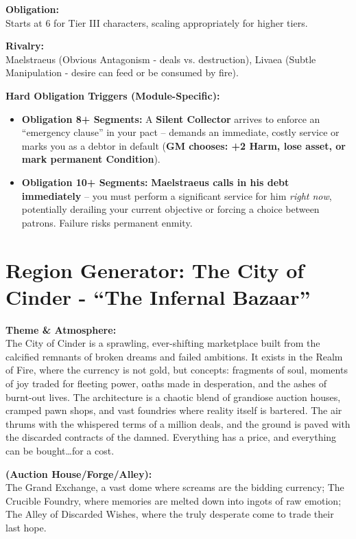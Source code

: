 \documentclass[11pt,letterpaper]{article}
\newcommand{\patronbox}[1]{\noindent\textbf{#1}\\}
\begin{document}
\patronbox{Obligation:} Starts at 6 for Tier III characters, scaling appropriately for higher tiers.

\patronbox{Rivalry:} Maelstraeus (Obvious Antagonism - deals vs. destruction), Livaea (Subtle Manipulation - desire can feed or be consumed by fire).

\patronbox{Hard Obligation Triggers (Module-Specific):}
\begin{itemize}[leftmargin=*]
    \item \textbf{Obligation 8+ Segments:} A \textbf{Silent Collector} arrives to enforce an ``emergency clause'' in your pact -- demands an immediate, costly service or marks you as a debtor in default (\textbf{GM chooses: +2 Harm, lose asset, or mark permanent Condition}).
    \item \textbf{Obligation 10+ Segments:} \textbf{Maelstraeus calls in his debt immediately} -- you must perform a significant service for him \textit{right now}, potentially derailing your current objective or forcing a choice between patrons. Failure risks permanent enmity.
\end{itemize}

\newpage

\section{Region Generator: The City of Cinder - ``The Infernal Bazaar''}

\patronbox{Theme \& Atmosphere:} The City of Cinder is a sprawling, ever-shifting marketplace built from the calcified remnants of broken dreams and failed ambitions. It exists in the Realm of Fire, where the currency is not gold, but concepts: fragments of soul, moments of joy traded for fleeting power, oaths made in desperation, and the ashes of burnt-out lives. The architecture is a chaotic blend of grandiose auction houses, cramped pawn shops, and vast foundries where reality itself is bartered. The air thrums with the whispered terms of a million deals, and the ground is paved with the discarded contracts of the damned. Everything has a price, and everything can be bought\dots for a cost.

\patronbox{(Auction House/Forge/Alley):} The Grand Exchange, a vast dome where screams are the bidding currency; The Crucible Foundry, where memories are melted down into ingots of raw emotion; The Alley of Discarded Wishes, where the truly desperate come to trade their last hope.
\end{document}
